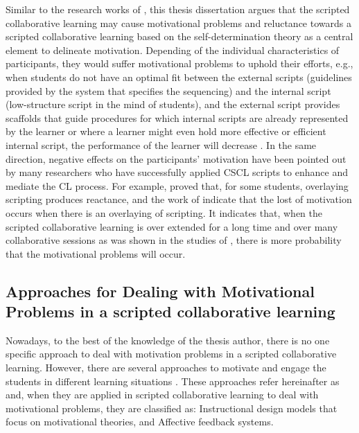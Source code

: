 Similar to the research works of , this thesis dissertation argues that the scripted collaborative learning may cause motivational problems and reluctance towards a scripted collaborative learning based on the self-determination theory \cite{DeciRyan2010} as a central element to delineate motivation.
Depending of the individual characteristics of participants, they would suffer motivational problems to uphold their efforts, e.g., when students do not have an optimal fit between the external scripts (guidelines provided by the system that specifies the sequencing) and the internal script (low-structure script in the mind of students), and the external script provides scaffolds that guide procedures for which internal scripts are already represented by the learner or where a learner might even hold more effective or efficient internal script, the performance of the learner will decrease \cite{StegmannMuGehlen-BaumFischer2011}.
In the same direction, negative effects on the participants' motivation have been pointed out by many researchers who have successfully applied CSCL scripts to enhance and mediate the CL process.
For example,  proved  that, for some students, overlaying scripting produces reactance, and the work of indicate that the lost of motivation occurs when there is an overlaying of scripting.
It indicates that, when the scripted collaborative learning is over extended for a long time and over many collaborative sessions as was shown in the studies of , there is more probability that the motivational problems will occur.


\subsection{Approaches for Dealing with Motivational Problems in a scripted collaborative learning}

Nowadays, to the best of the knowledge of the thesis author, there is no one specific approach to deal with motivation problems in a scripted collaborative learning.
However, there are several approaches to motivate and engage the students in different learning situations \cite{Hardre2003,ReigeluthKrathwohlCarr-Chellman1983,Spitzer1996}.
These approaches refer hereinafter as  and, when they are applied in scripted collaborative learning to deal with motivational problems, they are classified as:
Instructional design models that focus on motivational theories, and Affective feedback systems.  

